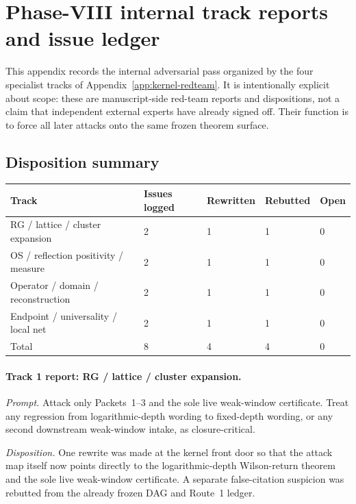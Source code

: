 \section{Phase-VIII internal track reports and issue ledger}\label{app:kernel-issue-log}

This appendix records the internal adversarial pass organized by the four specialist tracks of Appendix~\ref{app:kernel-redteam}. It is intentionally explicit about scope: these are manuscript-side red-team reports and dispositions, not a claim that independent external experts have already signed off. Their function is to force all later attacks onto the same frozen theorem surface.

\subsection*{Disposition summary}
\begin{center}
\small
\setlength{\tabcolsep}{4pt}
\renewcommand{\arraystretch}{1.08}
\begin{tabular}{@{}p{3.1cm}p{1.35cm}p{1.35cm}p{1.35cm}p{1.2cm}@{}}
\toprule
\textbf{Track} & \textbf{Issues logged} & \textbf{Rewritten} & \textbf{Rebutted} & \textbf{Open}\\
\midrule
RG / lattice / cluster expansion & 2 & 1 & 1 & 0\\
OS / reflection positivity / measure & 2 & 1 & 1 & 0\\
Operator / domain / reconstruction & 2 & 1 & 1 & 0\\
Endpoint / universality / local net & 2 & 1 & 1 & 0\\
\midrule
Total & 8 & 4 & 4 & 0\\
\bottomrule
\end{tabular}
\end{center}

\paragraph{Track 1 report: RG / lattice / cluster expansion.}
\emph{Prompt.} Attack only Packets~1--3 and the sole live weak-window certificate. Treat any regression from logarithmic-depth wording to fixed-depth wording, or any second downstream weak-window intake, as closure-critical.\par
\emph{Disposition.} One rewrite was made at the kernel front door so that the attack map itself now points directly to the logarithmic-depth Wilson-return theorem and the sole live weak-window certificate. A separate false-citation suspicion was rebutted from the already frozen DAG and Route~1 ledger.

